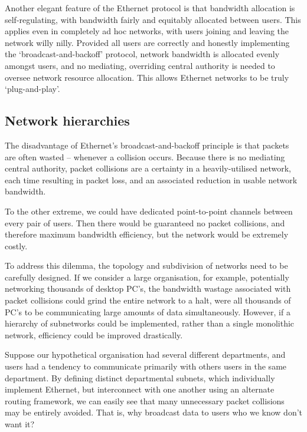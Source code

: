 \documentclass[aps,rmp,twocolumn,amsmath,amssymb,nofootinbib,superscriptaddress]{revtex4}
\begin{document}
Another elegant feature of the Ethernet protocol is that bandwidth allocation is self-regulating, with bandwidth fairly and equitably allocated between users. This applies even in completely ad hoc networks, with users joining and leaving the network willy nilly. Provided all users are correctly and honestly implementing the `broadcast-and-backoff' protocol, network bandwidth is allocated evenly amongst users, and no mediating, overriding central authority is needed to oversee network resource allocation. This allows Ethernet networks to be truly `plug-and-play'.

%
%

\subsection{Network hierarchies}

The disadvantage of Ethernet's broadcast-and-backoff principle is that packets are often wasted -- whenever a collision occurs. Because there is no mediating central authority, packet collisions are a certainty in a heavily-utilised network, each time resulting in packet loss, and an associated reduction in usable network bandwidth.

To the other extreme, we could have dedicated point-to-point channels between every pair of users. Then there would be guaranteed no packet collisions, and therefore maximum bandwidth efficiency, but the network would be extremely costly.

To address this dilemma, the topology and subdivision of networks need to be carefully designed. If we consider a large organisation, for example, potentially networking thousands of desktop PC's, the bandwidth wastage associated with packet collisions could grind the entire network to a halt, were all thousands of PC's to be communicating large amounts of data simultaneously. However, if a hierarchy of subnetworks could be implemented, rather than a single monolithic network, efficiency could be improved drastically.

Suppose our hypothetical organisation had several different departments, and users had a tendency to communicate primarily with others users in the same department. By defining distinct departmental subnets, which individually implement Ethernet, but interconnect with one another using an alternate routing framework, we can easily see that many unnecessary packet collisions may be entirely avoided. That is, why broadcast data to users who we know don't want it?
\end{document}
